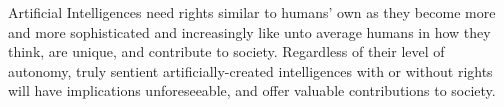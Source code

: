 Artificial Intelligences need rights similar to humans' own as they become more and more sophisticated and increasingly like unto average humans in how they think, are unique, and contribute to society. Regardless of their level of autonomy, truly sentient artificially-created intelligences with or without rights will have implications unforeseeable, and offer valuable contributions to society.